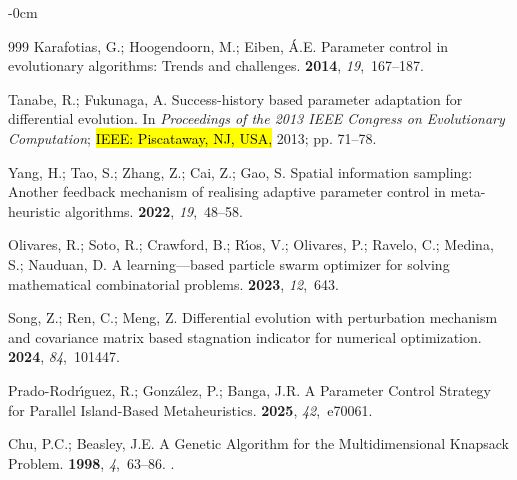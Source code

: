 \documentclass[mathematics,article,accept,moreauthors]{Definitions/mdpi}
\begin{document}
\begin{adjustwidth}{-\extralength}{0cm}
\begin{thebibliography}{999}
Karafotias, G.; Hoogendoorn, M.; Eiben, {\'A}.E.
\newblock Parameter control in evolutionary algorithms: Trends and challenges.
 {\bf 2014}, {\em
  19},~167--187.

Tanabe, R.; Fukunaga, A.
\newblock Success-history based parameter adaptation for differential
  evolution.
\newblock In \textit{Proceedings of the 2013 IEEE Congress on Evolutionary Computation};
\hl{IEEE: Piscataway, NJ, USA,} %
 2013; pp. 71--78.

Yang, H.; Tao, S.; Zhang, Z.; Cai, Z.; Gao, S.
\newblock Spatial information sampling: Another feedback mechanism of realising
  adaptive parameter control in meta-heuristic algorithms.
 {\bf 2022},
  {\em 19},~48--58.

Olivares, R.; Soto, R.; Crawford, B.; R{\'\i}os, V.; Olivares, P.; Ravelo, C.;
  Medina, S.; Nauduan, D.
\newblock A learning—based particle swarm optimizer for solving mathematical
  combinatorial problems.
 {\bf 2023}, {\em 12},~643.

Song, Z.; Ren, C.; Meng, Z.
\newblock Differential evolution with perturbation mechanism and covariance
  matrix based stagnation indicator for numerical optimization.
 {\bf 2024}, {\em
  84},~101447.

Prado-Rodr{\'\i}guez, R.; Gonz{\'a}lez, P.; Banga, J.R.
\newblock A Parameter Control Strategy for Parallel Island-Based
  Metaheuristics.
 {\bf 2025}, {\em 42},~e70061.

Chu, P.C.; Beasley, J.E.
\newblock A Genetic Algorithm for the Multidimensional Knapsack Problem.
 {\bf 1998}, {\em 4},~63--86.
. %



\end{thebibliography}
\end{adjustwidth}
\end{document}
